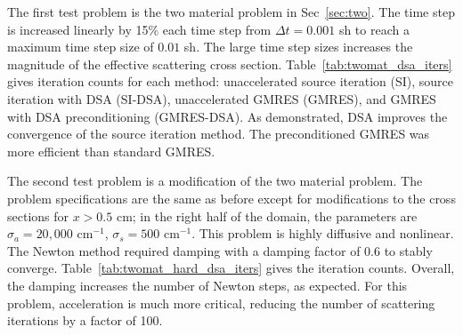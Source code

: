 {The first test problem is the two material
problem in Sec~\ref{sec:two}.     The time step is increased linearly by 15\% each time step from $\Delta
t=0.001$ sh to reach a maximum time step size of $0.01$ sh.  The large time step sizes
increases the magnitude of the effective scattering cross section.
Table~\ref{tab:twomat_dsa_iters} gives iteration counts for each method: unaccelerated
source iteration (SI), source iteration with DSA (SI-DSA), unaccelerated GMRES (GMRES),
and GMRES with DSA preconditioning (GMRES-DSA).  As demonstrated, DSA improves the
convergence of the source iteration method.  The preconditioned GMRES was more efficient
than standard GMRES.

The second test problem is a modification of the two material problem. The problem
specifications are the same as before except for modifications to the cross sections for
$x>0.5$ cm; in the right half of the domain, the
parameters are $\sigma_a = 20,000$ cm$^{-1}$, $\sigma_s=500 $ cm$^{-1}$.  This problem is
highly diffusive and nonlinear. The Newton method required damping with a damping factor of $0.6$ to
stably converge.  Table~\ref{tab:twomat_hard_dsa_iters} gives the iteration counts.
Overall, the damping increases the number of Newton steps, as expected. For this problem,
acceleration is much more critical, reducing the number of scattering iterations by a
factor of 100.  

}
